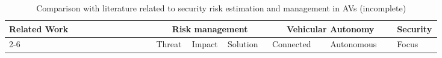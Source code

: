 \begin{table}[htp!]
\vspace{-15pt}
    \centering
    \label{tab:relatedwork}
    \caption{Comparison with literature related to security risk estimation and management in AVs (incomplete)}
    \begin{tabular}{|p{0.33\linewidth}|p{0.08\linewidth}|p{0.08\linewidth}|p{0.1\linewidth}|p{0.13\linewidth}|p{0.15\linewidth}|p{0.1\linewidth}|}
    \hline
        Related Work & \multicolumn{3}{c|}{Risk management} & \multicolumn{2}{c|}{Vehicular Autonomy} &  \multirow{2}{*}{Security} \\  \cline{2-6}
         & Threat & Impact & Solution & Connected & Autonomous & Focus \\ \hline
         

\end{tabular}
\end{table}
